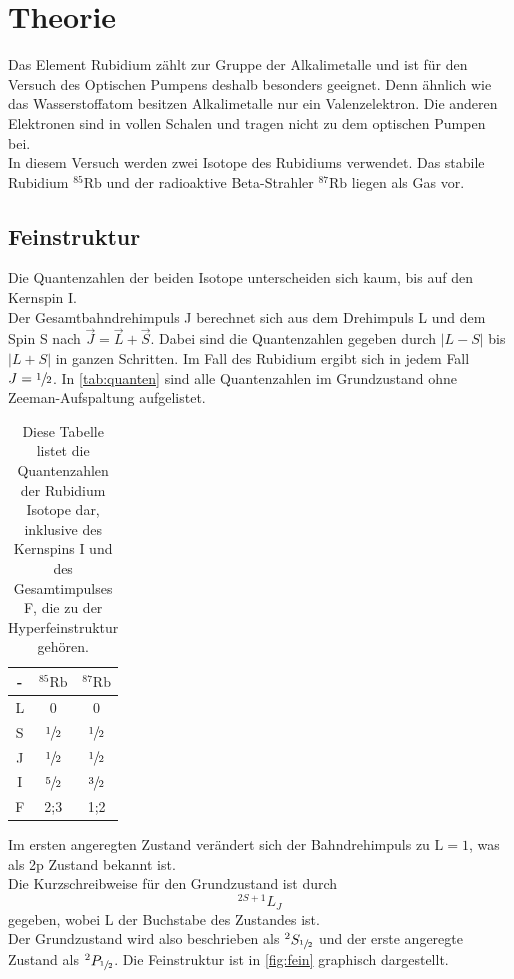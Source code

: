 \section{Theorie}
\label{sec:theorie}

Das Element Rubidium zählt zur Gruppe der Alkalimetalle und ist für den Versuch des Optischen Pumpens deshalb besonders geeignet.
Denn ähnlich wie das Wasserstoffatom besitzen Alkalimetalle nur ein Valenzelektron.
Die anderen Elektronen sind in vollen Schalen und tragen nicht zu dem optischen Pumpen bei.\\
In diesem Versuch werden zwei Isotope des Rubidiums verwendet.
Das stabile Rubidium $^{85}\text{Rb}$ und der radioaktive Beta-Strahler $^{87}\text{Rb}$ liegen als Gas vor.

\subsection{Feinstruktur}
Die Quantenzahlen der beiden Isotope unterscheiden sich kaum, bis auf den Kernspin I.\\
Der Gesamtbahndrehimpuls J berechnet sich aus dem Drehimpuls L und dem Spin S nach $\vec{J} = \vec{L} + \vec{S}$.
Dabei sind die Quantenzahlen gegeben durch $|L-S|$ bis $|L+S|$ in ganzen Schritten.
Im Fall des Rubidium ergibt sich in jedem Fall $J=\sfrac{1}{2}$.
In \autoref{tab:quanten} sind alle Quantenzahlen im Grundzustand ohne Zeeman-Aufspaltung aufgelistet.

\begin{table}[H]
    \centering
    \begin{tabular}{c c c}
        \toprule
        - & $^{85}\text{Rb}$ & $^{87}\text{Rb}$\\
        \midrule
        L & 0 & 0\\
        S & $\sfrac{1}{2}$ & $\sfrac{1}{2}$\\
        J & $\sfrac{1}{2}$ & $\sfrac{1}{2}$\\
        I & $\sfrac{5}{2}$ & $\sfrac{3}{2}$\\
        F & 2;3 & 1;2\\
        \bottomrule
    \end{tabular}
    \caption{Diese Tabelle listet die Quantenzahlen der Rubidium Isotope dar, inklusive des Kernspins I und des Gesamtimpulses F, die zu der Hyperfeinstruktur gehören.}
    \label{tab:quanten}
\end{table}

Im ersten angeregten Zustand verändert sich der Bahndrehimpuls zu $\text{L}=1$, was als 2p Zustand bekannt ist.\\
Die Kurzschreibweise für den Grundzustand ist durch
\begin{equation}
    ^{2S+1}L_J
\end{equation}
gegeben, wobei L der Buchstabe des Zustandes ist.\\
Der Grundzustand wird also beschrieben als $^2S_{\sfrac{1}{2}}$ und der erste angeregte Zustand als $^2P_{\sfrac{1}{2}}$.
Die Feinstruktur ist in \autoref{fig:fein} graphisch dargestellt.

